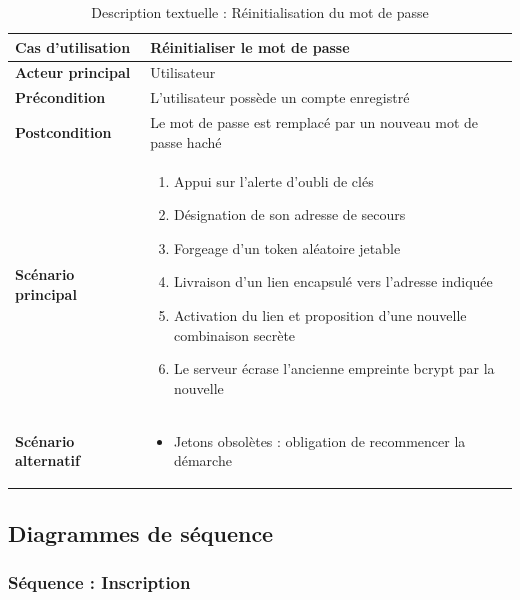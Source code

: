 \begin{table}[H]
    \centering
    \caption{Description textuelle : Réinitialisation du mot de passe}
    \label{tab:desc_reset_password}
    \renewcommand{\arraystretch}{1.3}
    \begin{tabular}{|p{4cm}|p{8.5cm}|}
        \hline
        \textbf{Cas d'utilisation} & Réinitialiser le mot de passe \\
        \hline
        \textbf{Acteur principal} & Utilisateur \\
        \hline
        \textbf{Précondition} & L'utilisateur possède un compte enregistré \\
        \hline
        \textbf{Postcondition} & Le mot de passe est remplacé par un nouveau mot de passe haché \\
        \hline
        \textbf{Scénario principal} &
        \begin{enumerate}
            \item Appui sur l'alerte d'oubli de clés
            \item Désignation de son adresse de secours
            \item Forgeage d'un token aléatoire jetable
            \item Livraison d'un lien encapsulé vers l'adresse indiquée
            \item Activation du lien et proposition d'une nouvelle combinaison secrète
            \item Le serveur écrase l'ancienne empreinte bcrypt par la nouvelle
        \end{enumerate} \\
        \hline
        \textbf{Scénario alternatif} &
        \begin{itemize}
            \item[4a.] Jetons obsolètes : obligation de recommencer la démarche
        \end{itemize} \\
        \hline
    \end{tabular}
\end{table}

\subsection{Diagrammes de séquence}

\subsubsection{Séquence : Inscription}

